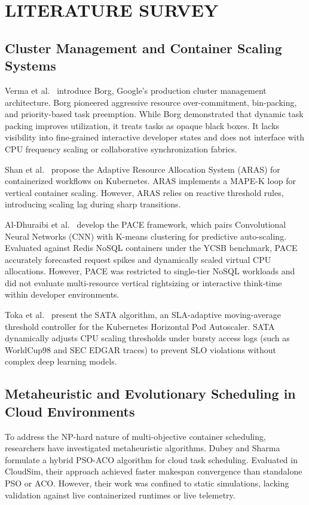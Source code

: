 \documentclass[12pt,a4paper]{report}
\begin{document}
\chapter{LITERATURE SURVEY}



\section{Cluster Management and Container Scaling Systems}
Verma et al.~\cite{borg} introduce Borg, Google's production cluster management architecture. Borg pioneered aggressive resource over-commitment, bin-packing, and priority-based task preemption. While Borg demonstrated that dynamic task packing improves utilization, it treats tasks as opaque black boxes. It lacks visibility into fine-grained interactive developer states and does not interface with CPU frequency scaling or collaborative synchronization fabrics.

Shan et al.~\cite{aras} propose the Adaptive Resource Allocation System (ARAS) for containerized workflows on Kubernetes. ARAS implements a MAPE-K loop for vertical container scaling. However, ARAS relies on reactive threshold rules, introducing scaling lag during sharp transitions.

Al-Dhuraibi et al.~\cite{pace} develop the PACE framework, which pairs Convolutional Neural Networks (CNN) with K-means clustering for predictive auto-scaling. Evaluated against Redis NoSQL containers under the YCSB benchmark, PACE accurately forecasted request spikes and dynamically scaled virtual CPU allocations. However, PACE was restricted to single-tier NoSQL workloads and did not evaluate multi-resource vertical rightsizing or interactive think-time within developer environments.

Toka et al.~\cite{sata} present the SATA algorithm, an SLA-adaptive moving-average threshold controller for the Kubernetes Horizontal Pod Autoscaler. SATA dynamically adjusts CPU scaling thresholds under bursty access logs (such as WorldCup98 and SEC EDGAR traces) to prevent SLO violations without complex deep learning models.

\section{Metaheuristic and Evolutionary Scheduling in Cloud Environments}
To address the NP-hard nature of multi-objective container scheduling, researchers have investigated metaheuristic algorithms. Dubey and Sharma~\cite{psoaco} formulate a hybrid PSO-ACO algorithm for cloud task scheduling. Evaluated in CloudSim, their approach achieved faster makespan convergence than standalone PSO or ACO. However, their work was confined to static simulations, lacking validation against live containerized runtimes or live telemetry.
\end{document}
